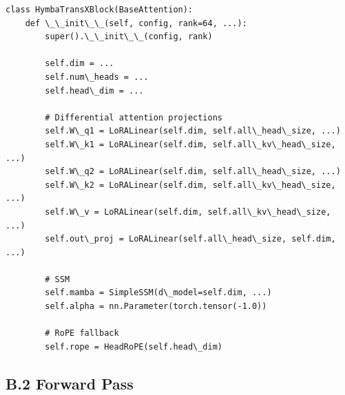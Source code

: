 \begin{lstlisting}
class HymbaTransXBlock(BaseAttention):
    def \_\_init\_\_(self, config, rank=64, ...):
        super().\_\_init\_\_(config, rank)
        
        self.dim = ...
        self.num\_heads = ...
        self.head\_dim = ...
        
        # Differential attention projections
        self.W\_q1 = LoRALinear(self.dim, self.all\_head\_size, ...)
        self.W\_k1 = LoRALinear(self.dim, self.all\_kv\_head\_size, ...)
        self.W\_q2 = LoRALinear(self.dim, self.all\_head\_size, ...)
        self.W\_k2 = LoRALinear(self.dim, self.all\_kv\_head\_size, ...)
        self.W\_v = LoRALinear(self.dim, self.all\_kv\_head\_size, ...)
        self.out\_proj = LoRALinear(self.all\_head\_size, self.dim, ...)
        
        # SSM
        self.mamba = SimpleSSM(d\_model=self.dim, ...)
        self.alpha = nn.Parameter(torch.tensor(-1.0))
        
        # RoPE fallback
        self.rope = HeadRoPE(self.head\_dim)
\end{lstlisting}

\subsection{B.2 Forward Pass}

